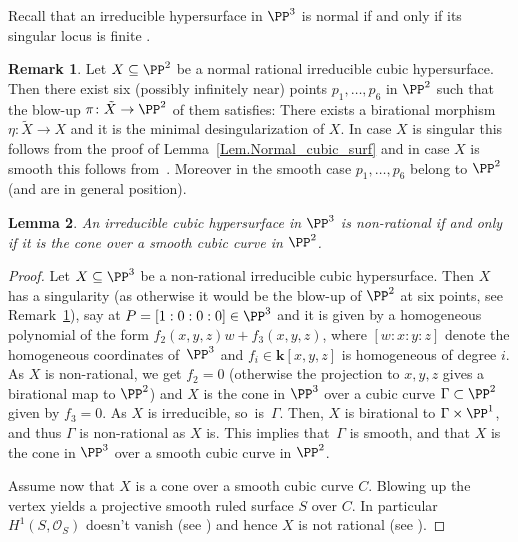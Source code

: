 \documentclass[JEP,XML,SOM,Unicode,NoFloatCountersInSection,published]{cedram}
\newtheorem{lemma}{Lemma}[section]
\theoremstyle{definition}
\newtheorem{remark}[lemma]{Remark}
\newcommand{\kk}{\mathbf{k}}
\begin{document}
Recall that an irreducible hypersurface in $\PP^3$ is normal if and only if its singular locus is
finite \cite[Ch.\,II, Prop.\,8.23]{Ha1977Algebraic-geometry}.

\begin{remark}
\label{Rem.Desingularization_is_blow-up}
Let $X \subseteq \PP^2$ be a normal rational irreducible cubic hypersurface. Then
there exist six (possibly infinitely near) points $p_1, \ldots, p_6$ in $\PP^2$
such that the blow-up $\pi \colon \tilde{X} \to \PP^2$ of them satisfies:
There exists a birational morphism $\eta \colon \tilde{X} \to X$ and it is the minimal desingularization of $X$.
In case $X$ is singular this follows from the proof of Lemma~\ref{Lem.Normal_cubic_surf}
and in case $X$ is smooth this follows from~\cite[Ch.\,V, Cor.\,4.7, Rem.\,4.7.1]{Ha1977Algebraic-geometry}. Moreover in the smooth case $p_1, \ldots, p_6$
belong to $\PP^2$ (and are in general position).
\end{remark}
\begin{lemma}
\label{Lem.Non-rational_iff_cone_over_elliptic_curve}
An irreducible cubic hypersurface in $\PP^3$ is non-rational if and only if it is the cone
over a smooth cubic curve in $\PP^2$.
\end{lemma}

\begin{proof}
Let $X \subseteq \PP^3$ be a non-rational irreducible cubic hypersurface.
Then $X$ has a singularity (as otherwise it would be the blow-up of $\PP^2$ at six points, see Remark~\ref{Rem.Desingularization_is_blow-up}),
say at $P = [1:0:0:0] \in \PP^3$ and it
is given by a homogeneous polynomial of the form $f_2(x, y, z) w + f_3(x, y, z)$,
where $[w: x:y:z]$ denote the homogeneous coordinates of~$\PP^3$ and
$f_i \in \kk[x, y, z]$ is homogeneous of degree $i$. As $X$ is non-rational, we get
$f_2 = 0$ (otherwise the projection to $x,y,z$ gives a birational map to $\PP^2$) and $X$ is the cone in $\PP^3$ over a cubic curve $\Gamma\subset\PP^2$ given by $f_3=0$. As $X$ is irreducible, so~is~$\Gamma$. Then, $X$ is birational to $\Gamma\times \PP^1$, and thus $\Gamma$ is non-rational as $X$ is. This implies that~$\Gamma$ is smooth, and that $X$ is the cone in $\PP^3$ over a smooth cubic curve in $\PP^2$.

Assume now that $X$ is a cone over a smooth cubic curve $C$.
Blowing up the vertex yields a projective smooth ruled surface $S$ over
$C$. In particular $H^1(S, \mathcal{O}_S)$ doesn't vanish
(see \cite[Ch.\,V, Cor.\,2.5]{Ha1977Algebraic-geometry}) and hence $X$ is not rational
(see \cite[Th.\,3.2]{KoSmCo2004Rational-and-nearl}).
\end{proof}
\end{document}
